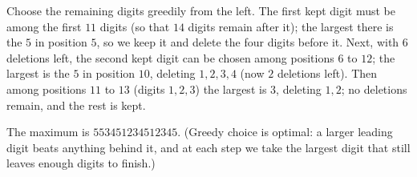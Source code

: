 Choose the remaining digits greedily from the left. The first kept digit must be among the first $11$ digits (so that $14$ digits remain after it); the largest there is the $5$ in position $5$, so we keep it and delete the four digits before it. Next, with $6$ deletions left, the second kept digit can be chosen among positions $6$ to $12$; the largest is the $5$ in position $10$, deleting $1,2,3,4$ (now $2$ deletions left). Then among positions $11$ to $13$ (digits $1,2,3$) the largest is $3$, deleting $1,2$; no deletions remain, and the rest is kept.

The maximum is $\boxed{553451234512345}$. (Greedy choice is optimal: a larger leading digit beats anything behind it, and at each step we take the largest digit that still leaves enough digits to finish.)
